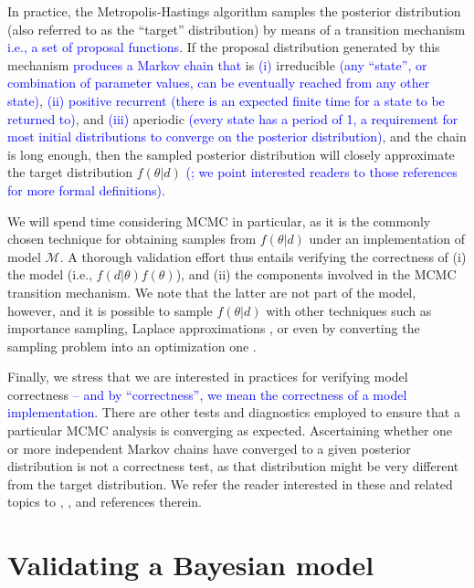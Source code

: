 \documentclass[oneside]{article}
\begin{document}
In practice, the Metropolis-Hastings algorithm samples the posterior distribution (also referred to as the ``target'' distribution) by means of a transition mechanism \textcolor{blue}{i.e., a set of proposal functions}. 
If the proposal distribution generated by this mechanism \textcolor{blue}{produces a Markov chain that }is \textcolor{blue}{(i) }irreducible \textcolor{blue}{(any ``state'', or combination of parameter values, can be eventually reached from any other state)}, \textcolor{blue}{(ii) positive recurrent (there is an expected finite time for a state to be returned to)}, and \textcolor{blue}{(iii) }aperiodic \textcolor{blue}{(every state has a period of 1, a requirement for most initial distributions to converge on the posterior distribution)}, and the chain is long enough, then the sampled posterior distribution will closely approximate the target distribution $f(\theta|d)$ \textcolor{blue}{(}\citealp{smith93,tierney94,gelman}\textcolor{blue}{; we point interested readers to those references for more formal definitions)}.

We will spend time considering MCMC in particular, as it is the commonly chosen technique for obtaining samples from $f(\theta|d)$ under an implementation of model $\mathcal{M}$.
A thorough validation effort thus entails verifying the correctness of (i) the model (i.e., $f(d|\theta)f(\theta)$), and (ii) the components involved in the MCMC transition mechanism.
We note that the latter are not part of the model, however, and it is  possible to sample $f(\theta|d)$ with other techniques such as importance sampling, Laplace approximations \citep{inla}, or even by converting the sampling problem into an optimization one \textcolor{blue}{\citep[e.g.,][]{zhang2024variational,bouckaert2024variational}}.

Finally, we stress that we are interested in practices for verifying model correctness \textcolor{blue}{-- and by ``correctness'', we mean the correctness of a model implementation}.
There are other tests and diagnostics employed to ensure that a particular MCMC analysis is converging as expected.
Ascertaining whether one or more independent Markov chains have converged to a given posterior distribution is not a correctness test, as that distribution might be very different from the target distribution. 
We refer the reader interested in these and related topics to \cite{rwty}, \cite{fabreti2022}, \cite{magee2023} and references therein.

\section*{Validating a Bayesian model}
\end{document}
